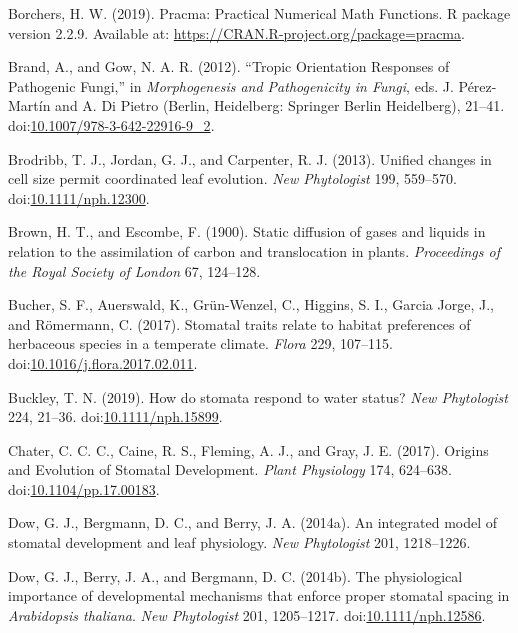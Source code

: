 \documentclass[utf8]{frontiersSCNS}
\newlength{\cslhangindent}
\newenvironment{cslreferences}%
  {\setlength{\parindent}{0pt}%
  \everypar{\setlength{\hangindent}{\cslhangindent}}\ignorespaces}%
  {\par}
\begin{document}
\begin{cslreferences}
\leavevmode\hypertarget{ref-borchers_pracma:_2019}{}%
Borchers, H. W. (2019). Pracma: Practical Numerical Math Functions. R
package version 2.2.9. Available at:
\url{https://CRAN.R-project.org/package=pracma}.

\leavevmode\hypertarget{ref-perez-martin_tropic_2012}{}%
Brand, A., and Gow, N. A. R. (2012). ``Tropic Orientation Responses of
Pathogenic Fungi,'' in \emph{Morphogenesis and Pathogenicity in Fungi},
eds. J. Pérez-Martín and A. Di Pietro (Berlin, Heidelberg: Springer
Berlin Heidelberg), 21--41.
doi:\href{https://doi.org/10.1007/978-3-642-22916-9_2}{10.1007/978-3-642-22916-9\_2}.

\leavevmode\hypertarget{ref-brodribb_unified_2013}{}%
Brodribb, T. J., Jordan, G. J., and Carpenter, R. J. (2013). Unified
changes in cell size permit coordinated leaf evolution. \emph{New
Phytologist} 199, 559--570.
doi:\href{https://doi.org/10.1111/nph.12300}{10.1111/nph.12300}.

\leavevmode\hypertarget{ref-brown_static_1900}{}%
Brown, H. T., and Escombe, F. (1900). Static diffusion of gases and
liquids in relation to the assimilation of carbon and translocation in
plants. \emph{Proceedings of the Royal Society of London} 67, 124--128.

\leavevmode\hypertarget{ref-bucher_stomatal_2017}{}%
Bucher, S. F., Auerswald, K., Grün-Wenzel, C., Higgins, S. I., Garcia
Jorge, J., and Römermann, C. (2017). Stomatal traits relate to habitat
preferences of herbaceous species in a temperate climate. \emph{Flora}
229, 107--115.
doi:\href{https://doi.org/10.1016/j.flora.2017.02.011}{10.1016/j.flora.2017.02.011}.

\leavevmode\hypertarget{ref-buckley_how_2019}{}%
Buckley, T. N. (2019). How do stomata respond to water status? \emph{New
Phytologist} 224, 21--36.
doi:\href{https://doi.org/10.1111/nph.15899}{10.1111/nph.15899}.

\leavevmode\hypertarget{ref-chater_origins_2017}{}%
Chater, C. C. C., Caine, R. S., Fleming, A. J., and Gray, J. E. (2017).
Origins and Evolution of Stomatal Development. \emph{Plant Physiology}
174, 624--638.
doi:\href{https://doi.org/10.1104/pp.17.00183}{10.1104/pp.17.00183}.

\leavevmode\hypertarget{ref-dow_integrated_2014}{}%
Dow, G. J., Bergmann, D. C., and Berry, J. A. (2014a). An integrated
model of stomatal development and leaf physiology. \emph{New
Phytologist} 201, 1218--1226.

\leavevmode\hypertarget{ref-dow_physiological_2014}{}%
Dow, G. J., Berry, J. A., and Bergmann, D. C. (2014b). The physiological
importance of developmental mechanisms that enforce proper stomatal
spacing in \emph{Arabidopsis thaliana}. \emph{New Phytologist} 201,
1205--1217.
doi:\href{https://doi.org/10.1111/nph.12586}{10.1111/nph.12586}.


\end{cslreferences}
\end{document}

